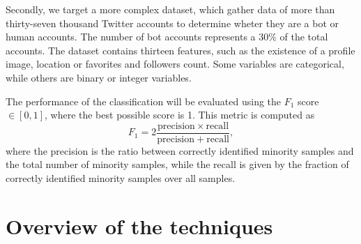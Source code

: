\documentclass[conference]{IEEEtran}
\begin{document}
		Secondly, we target a more complex dataset, which gather data of more than thirty-seven thousand Twitter accounts to determine wheter they are a bot or human accounts. The number of bot accounts represents a 30\% of the total accounts. The dataset contains thirteen features, such as the existence of a profile image, location or favorites and followers count. Some variables are categorical, while others are binary or integer variables. 

		The performance of the classification will be evaluated using the $F_1$ score $\in [0, 1]$, where the best possible score is 1. This metric is computed as
			\begin{equation*}
				F_1 = 2\frac{\mathrm{precision}\times\mathrm{recall}}{\mathrm{precision}+\mathrm{recall}},
			\end{equation*}
where the precision is the ratio between correctly identified minority samples and the total number of minority samples, while the recall is given by the fraction of correctly identified minority samples over all samples.


\section{Overview of the techniques}
\end{document}

